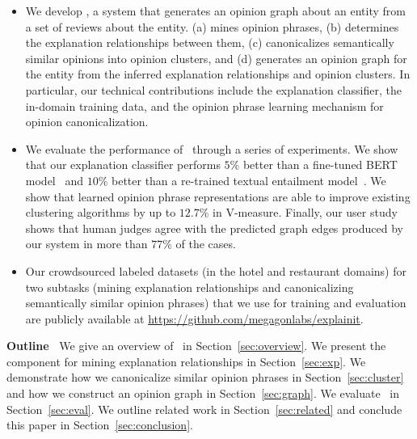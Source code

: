 \begin{itemize} %
    \item We develop \system, a system that generates an opinion graph about an entity from a set of reviews about the entity. \system{} (a) mines opinion phrases, (b) determines the explanation relationships between them, (c) canonicalizes semantically similar opinions into opinion clusters, and (d) generates an opinion graph for the entity from the inferred explanation relationships and opinion clusters. In particular, our technical contributions include the explanation classifier, the in-domain training data, and the opinion phrase learning mechanism for opinion canonicalization.
    \item We evaluate the performance of \system\ through a series of experiments. We show that our explanation classifier performs $5\%$ better than a fine-tuned BERT model~\cite{devlin2018bert} and $10\%$ better than a re-trained textual entailment model~\cite{parikh-etal-2016-decomposable}. We show that learned opinion phrase representations are able to improve existing clustering algorithms by up to $12.7\%$ in V-measure.  
    Finally, our user study shows that human judges agree with the predicted graph edges produced by our system in more than $77\%$ of the cases. 
    \item Our crowdsourced labeled datasets (in the hotel and restaurant domains) for two subtasks (mining explanation relationships and canonicalizing semantically similar opinion phrases) that we use for training and evaluation are publicly available at \url{https://github.com/megagonlabs/explainit}.
\end{itemize}

\noindent
{\bf Outline~}
We give an overview of \system\ in Section~\ref{sec:overview}. We present the component for mining explanation relationships in Section~\ref{sec:exp}. We demonstrate how we canonicalize similar opinion phrases in Section~\ref{sec:cluster} and how we construct an opinion graph in Section~\ref{sec:graph}. We evaluate \system\ in Section~\ref{sec:eval}. We outline related work in Section~\ref{sec:related} and conclude this paper in Section~\ref{sec:conclusion}.


